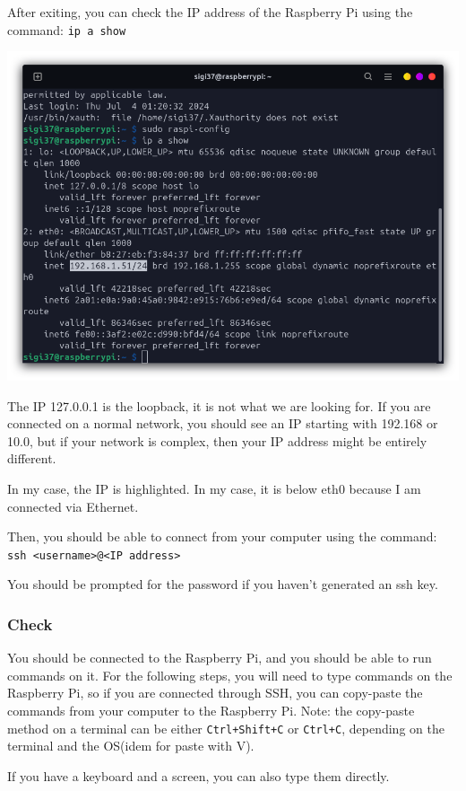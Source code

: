 \documentclass{article}
\begin{document}
After exiting, you can check the IP address of the Raspberry Pi using the command:
\texttt{ip a show}

\includegraphics[scale=0.37]{img/ip_a_show.png}

The IP 127.0.0.1 is the loopback, it is not what we are looking for.
If you are connected on a normal network, you should see an IP
starting with 192.168 or 10.0, but if your network is complex, then your IP address might
be entirely different.

In my case, the IP is highlighted. In my case, it is below eth0 because I am connected via
Ethernet.

Then, you should be able to connect from your computer using the command:
\texttt{ssh <username>@<IP address>}

You should be prompted for the password if you haven't generated an ssh key.

\subsubsection{Check}

You should be connected to the Raspberry Pi, and you should be able to run commands on it.
For the following steps, you will need to type commands on the Raspberry Pi, so if you are
connected through SSH, you can copy-paste the commands from your computer to the Raspberry Pi.
Note: the copy-paste method on a terminal can be either \texttt{Ctrl+Shift+C} or
\texttt{Ctrl+C}, depending on the terminal and the OS(idem for paste with V).

If you have a keyboard and a screen, you can also type them directly.
\end{document}
